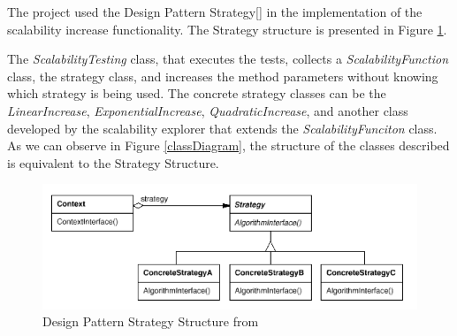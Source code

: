 The project used the Design Pattern Strategy[\citet{GOF1995}] in the implementation of the scalability increase functionality. The Strategy structure is presented in Figure \ref{strategyStructure}. 

The \emph{ScalabilityTesting} class, that executes the tests, collects a \emph{ScalabilityFunction} class, the strategy class, and increases the method parameters without knowing which strategy is being used. The concrete strategy classes can be the \emph{LinearIncrease}, \emph{ExponentialIncrease}, \emph{QuadraticIncrease}, and another class developed by the scalability explorer that extends the \emph{ScalabilityFunciton} class. As we can observe in Figure \ref{classDiagram}, the structure of the classes described is equivalent to the Strategy Structure.
\begin{figure}[htbp]
\begin{center}
	\includegraphics[scale=0.5]{images/strategyStructure}
\caption{Design Pattern Strategy Structure from \citet{GOF1995}}
\label{strategyStructure}
\end{center}
\end{figure}


